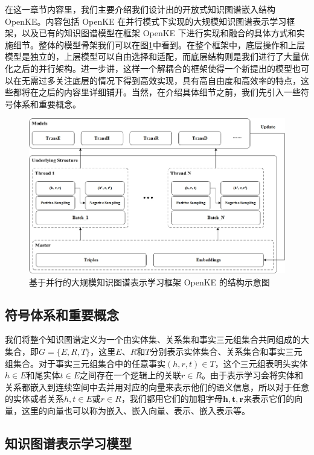 在这一章节内容里，我们主要介绍我们设计出的开放式知识图谱嵌入结构 OpenKE。内容包括 OpenKE 在并行模式下实现的大规模知识图谱表示学习框架，以及已有的知识图谱模型在框架 OpenKE 下进行实现和融合的具体方式和实施细节。整体的模型骨架我们可以在图\ref{fig:openke}中看到。在整个框架中，底层操作和上层模型是独立的，上层模型可以自由选择和适配，而底层结构则是我们进行了大量优化之后的并行架构。进一步讲，这样一个解耦合的框架使得一个新提出的模型也可以在无需过多关注底层的情况下得到高效实现，具有高自由度和高效率的特点，这些都将在之后的内容里详细铺开。当然，在介绍具体细节之前，我们先引入一些符号体系和重要概念。


\begin{figure}[h]
\centering
\includegraphics[width=1.0\linewidth]{figures/ch2/3.jpg}
\caption{基于并行的大规模知识图谱表示学习框架 OpenKE 的结构示意图}
\label{fig:openke}
\end{figure}

\subsection{符号体系和重要概念}

我们将整个知识图谱定义为一个由实体集、关系集和事实三元组集合共同组成的大集合，即$G = \{E, R, T\}$，这里$E$、$R$和$T$分别表示实体集合、关系集合和事实三元组集合。对于事实三元组集合中的任意事实$(h, r, t) \in T$，这个三元组表明头实体$h \in E$和尾实体$t \in E$之间存在一个逻辑上的关联$r \in R$。由于表示学习会将实体和关系都嵌入到连续空间中去并用对应的向量来表示他们的语义信息，所以对于任意的实体或者关系$h, t \in E$或$r \in R$，我们都用它们的加粗字母$\mathbf{h}, \mathbf{t}, \mathbf{r}$来表示它们的向量，这里的向量也可以称为嵌入、嵌入向量、表示、嵌入表示等。

\subsection{知识图谱表示学习模型}

